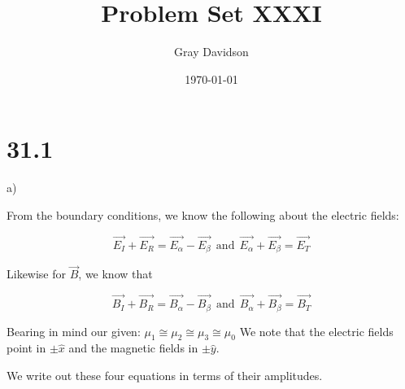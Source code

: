 \documentclass[aps,pre,nofootinbib]{revtex4}
\begin{document}
\title{Problem Set XXXI}

\author{Gray Davidson}
\date{\today}
\maketitle

\section{31.1}
a)

From the boundary conditions, we know the following about the electric fields: 

$$\vec{E_I} + \vec{E_R} = \vec{E_{\alpha}} - \vec{E_{\beta}} ~~\mbox{and}~~ \vec{E_{\alpha}} + \vec{E_{\beta}} = \vec{E_T}$$


Likewise for $\vec{B}$, we know that 

$$\vec{B_I} + \vec{B_R} = \vec{B_{\alpha}} - \vec{B_{\beta}} ~~\mbox{and}~~ \vec{B_{\alpha}} + \vec{B_{\beta}} = \vec{B_T}$$

Bearing in mind our given: $ \mu_1 \cong \mu_2 \cong \mu_3 \cong \mu_0 $
\bigskip
We note that the electric fields point in $\pm \hat{x}$ and the magnetic fields in $\pm \hat{y}$.  

We write out these four equations in terms of their amplitudes.  



\Hq
\end{document}
